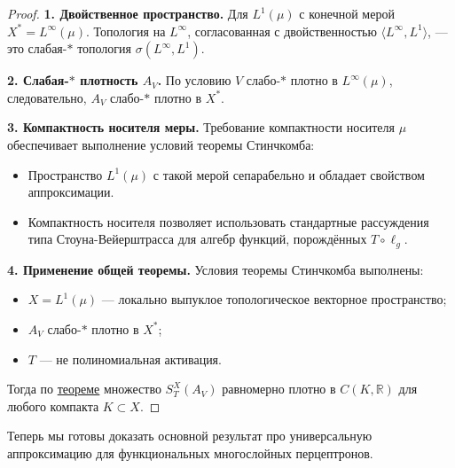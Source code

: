 \documentclass[../NDCNNAI_main.tex]{subfiles}
\begin{document}
\begin{proof}
    \textbf{1. Двойственное пространство.} Для \( L^1(\mu) \) с конечной мерой \( X^* = L^\infty(\mu) \). Топология на \( L^\infty \), согласованная с двойственностью \(\langle L^\infty, L^1 \rangle\), --- это слабая-$\ast$ топология \( \sigma(L^\infty, L^1) \).

    \textbf{2. Слабая-$\ast$ плотность \( A_V \).} По условию \( V \) слабо-$\ast$ плотно в \( L^\infty(\mu) \), следовательно, \( A_V \) слабо-$\ast$ плотно в \( X^* \).

    \textbf{3. Компактность носителя меры.} Требование компактности носителя \(\mu\) обеспечивает выполнение условий теоремы Стинчкомба: 
    \begin{itemize}
        \item Пространство \( L^1(\mu) \) с такой мерой сепарабельно и обладает свойством аппроксимации.
        \item Компактность носителя позволяет использовать стандартные рассуждения типа Стоуна-Вейерштрасса для алгебр функций, порождённых \( T \circ \ell_g \).
    \end{itemize}

    \textbf{4. Применение общей теоремы.} Условия теоремы Стинчкомба выполнены:
    \begin{itemize}
        \item \( X = L^1(\mu) \) --- локально выпуклое топологическое векторное пространство;
        \item \( A_V \) слабо-$\ast$ плотно в \( X^* \);
        \item \( T \) --- не полиномиальная активация.
    \end{itemize}
    Тогда по \hyperref[thm:stinchcombe]{теореме} множество \( S_T^X(A_V) \) равномерно плотно в \( C(K, \mathbb{R}) \) для любого компакта \( K \subset X \).
\end{proof}
Теперь мы готовы доказать основной результат про универсальную аппроксимацию для функциональных многослойных перцептронов.
\end{document}
